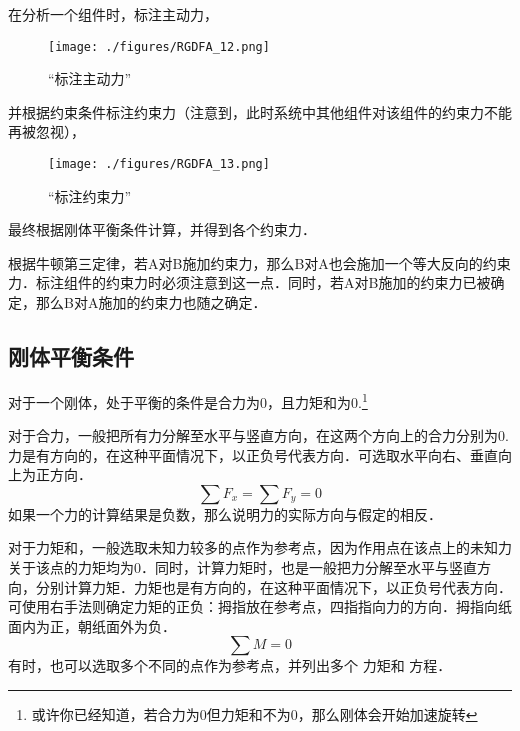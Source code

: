 在分析一个组件时，标注主动力，
\begin{figure}[ht]
\centering
\texttt{[image: ./figures/RGDFA\_12.png]}
\caption{“标注主动力”} \label{RGDFA_fig12}
\end{figure}
并根据约束条件标注约束力（注意到，此时系统中其他组件对该组件的约束力不能再被忽视），
\begin{figure}[ht]
\centering
\texttt{[image: ./figures/RGDFA\_13.png]}
\caption{“标注约束力”} \label{RGDFA_fig13}
\end{figure}
最终根据刚体平衡条件计算，并得到各个约束力．

根据牛顿第三定律，若A对B施加约束力，那么B对A也会施加一个等大反向的约束力．标注组件的约束力时必须注意到这一点．同时，若A对B施加的约束力已被确定，那么B对A施加的约束力也随之确定．

\subsection{刚体平衡条件}
对于一个刚体，处于平衡的条件是合力为0，且力矩和为0.\footnote{或许你已经知道，若合力为0但力矩和不为0，那么刚体会开始加速旋转}

对于合力，一般把所有力分解至水平与竖直方向，在这两个方向上的合力分别为0. 力是有方向的，在这种平面情况下，以正负号代表方向．可选取水平向右、垂直向上为正方向．
\begin{equation}
\sum F_x=\sum F_y=0
\end{equation}
如果一个力的计算结果是负数，那么说明力的实际方向与假定的相反．

对于力矩和，一般选取未知力较多的点作为参考点，因为作用点在该点上的未知力关于该点的力矩均为0．同时，计算力矩时，也是一般把力分解至水平与竖直方向，分别计算力矩．力矩也是有方向的，在这种平面情况下，以正负号代表方向．可使用右手法则确定力矩的正负：拇指放在参考点，四指指向力的方向．拇指向纸面内为正，朝纸面外为负．
\begin{equation}
\sum M=0
\end{equation}
有时，也可以选取多个不同的点作为参考点，并列出多个 力矩和 方程．

